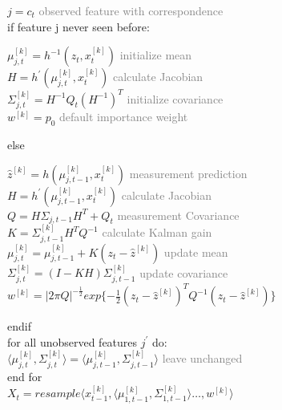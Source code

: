 \documentclass{article}
\begin{document}
\begin{textit}
\begin{addmargin}[1em]{2em}
        $j = c_t$ \hfill \textcolor{gray}{observed feature with correspondence}\\
        if feature j never seen before:
        \begin{addmargin}[1em]{2em}
            $\mu_{j,t}^{[k]} = h^{-1}(z_t,x_t^{[k]})$ \hfill \textcolor{gray}{initialize mean}\\
            $H = h^{'}(\mu_{j,t}^{[k]},x_t^{[k]})$ \hfill \textcolor{gray}{calculate Jacobian}\\
            $\Sigma_{j,t}^{[k]} = H^{-1}Q_t(H^{-1})^T$ \hfill \textcolor{gray}{initialize covariance}\\
            $w^[k] = p_0$ \hfill \textcolor{gray}{default importance weight}
        \end{addmargin}
        else
        \begin{addmargin}[1em]{2em}
            $\hat z^{[k]} = h(\mu_{j,t-1}^{[k]},x_t^{[k]})$ \hfill  \textcolor{gray}{measurement prediction}\\
            $H = h^{'}(\mu_{j,t-1}^{[k]},x_t^{[k]})$ \hfill \textcolor{gray}{calculate Jacobian}\\
            $Q = H\Sigma_{j,t-1} H^T + Q_t$ \hfill \textcolor{gray}{measurement Covariance} \\
            $K = \Sigma_{j,t-1}^{[k]}H^T Q^{-1}$ \hfill \textcolor{gray}{calculate Kalman gain} \\
            $\mu_{j,t}^{[k]} = \mu_{j,t-1}^{[k]} + K (z_t - \hat z ^{[k]})$  \hfill \textcolor{gray}{update mean} \\
            $\Sigma_{j,t}^{[k]} =(I -KH)\Sigma_{j,t-1}^{[k]}$ \hfill \textcolor{gray}{update covariance}\\
            $w^{[k]} = | 2\pi Q|^{-\frac{1}{2}} exp\{-\frac{1}{2}(z_t - \hat z^{[k]})^T Q^{-1} (z_t - \hat z^{[k]})\}$\\
        \end{addmargin}
        endif\\
        for all unobserved features $j^{'} $ do: \\
           \hspace*{1cm} $\langle \mu_{j,t}^{[k]},\Sigma_{j,t}^{[k]}\rangle =  \langle \mu_{j,t-1}^{[k]},\Sigma_{j,t-1}^{[k]}\rangle$ \hfill \textcolor{gray}{leave unchanged}\\
           end for \\
        $X_t = resample \langle x_{t-1}^{[k]}, \langle \mu_{1,t-1}^{[k]},\Sigma_{1,t-1}^{[k]} \rangle \dots{} ,w^{[k]} \rangle$
    \end{addmargin}

\end{textit}
\end{document}
